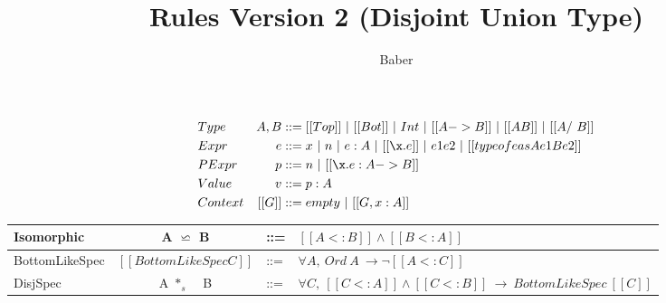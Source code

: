 \documentclass[a4paper]{article}
\title{Rules Version 2 (Disjoint Union Type)}
\author{Baber}
\begin{document}
\maketitle

\begin{align*}
&Type &A, B&::= [[Top]] ~ | ~[[Bot]]~|~ Int ~|~ [[A->B]]~ |~ [[A \/ B]] ~ |~ [[A /\ B]]\\
&Expr &e &::= x ~|~ n ~|~ e:A ~|~[[\x.e]] ~ | ~ e1e2 ~|~ [[typeof e as A e1 B e2]]\\
&PExpr & p &::= n ~|~ [[\x.e : A->B]] \\
&Value &v &::= p : A \\
&Context & [[G]] &::= empty~ |~ [[G , x : A]]
\end{align*}






     {\renewcommand{\arraystretch}{1.5}
     \begin{center}
     \begin{tabular}{|lcll|}
       \hline
      Isomorphic & A $\backsimeq$ B & ::= & $[[A <: B]] \wedge [[B <: A]]$ \\
       \hline
      BottomLikeSpec & $[[BottomLikeSpec C]]$ & ::= & $\forall A, ~ Ord ~ A ~ \rightarrow \neg [[A <: C]]$ \\
       \hline
      DisjSpec & A $*_s$ ~ B & ::= & $\forall C, ~ [[C <: A]] \wedge [[C <: B]] ~ \rightarrow ~ BottomLikeSpec ~ [[C]]$ \\
       \hline
     \end{tabular}
     \end{center} }



\bigskip

\ottdefnsOrdinary

\ottdefnsBottomLike

\ottdefnsDisjointness

\ottdefnsSubtyping

\ottdefnsTyping

\ottdefnsReduction
\end{document}
